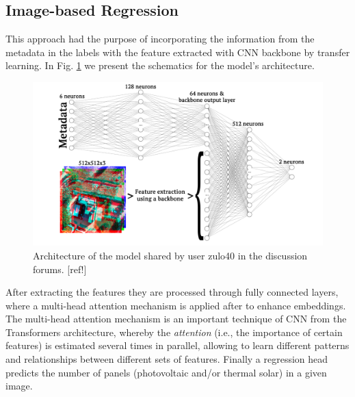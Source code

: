 \documentclass[conference]{IEEEtran}
\begin{document}
\subsection{Image-based Regression}

This approach had the purpose of incorporating the information from the metadata in the labels with the feature extracted with CNN backbone by transfer learning. In Fig. \ref{fig:nn} we present the schematics for the model's architecture.


\begin{figure}[H]
    \centering
    \includegraphics[width=1\linewidth]{assets/nn.png}
    \caption{Architecture of the model shared by user zulo40 in the discussion forums. [ref!]}
    \label{fig:nn}
\end{figure}

After extracting the features they are processed through fully connected layers, where a multi-head attention mechanism is applied after to enhance embeddings. The multi-head attention mechanism is an important technique of CNN from the Transformers architecture, whereby the \textit{attention} (i.e., the importance of certain features) is estimated several times in parallel, allowing to learn different patterns and relationships between different sets of features. Finally a regression head predicts the number of panels (photovoltaic and/or thermal solar) in a given image.
\end{document}
